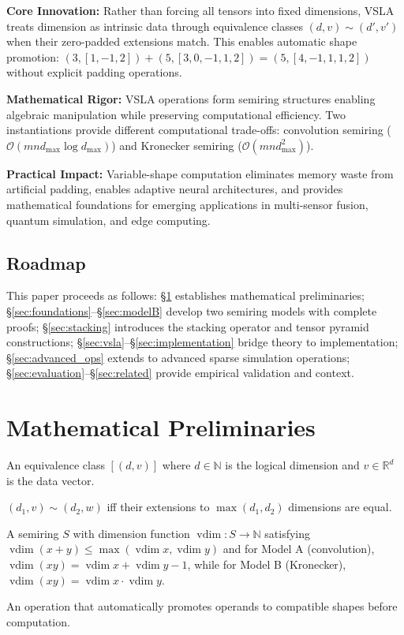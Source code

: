 \documentclass[11pt]{article}
\newcommand{\vdim}{\operatorname{vdim}}
\begin{document}
\textbf{Core Innovation:} Rather than forcing all tensors into fixed dimensions, VSLA treats dimension as intrinsic data through equivalence classes $(d,v) \sim (d',v')$ when their zero-padded extensions match. This enables automatic shape promotion: $(3,[1,-1,2]) + (5,[3,0,-1,1,2]) = (5,[4,-1,1,1,2])$ without explicit padding operations.

\textbf{Mathematical Rigor:} VSLA operations form semiring structures enabling algebraic manipulation while preserving computational efficiency. Two instantiations provide different computational trade-offs: convolution semiring ($\mathcal{O}(mn d_{\max} \log d_{\max})$) and Kronecker semiring ($\mathcal{O}(mn d_{\max}^2)$).

\textbf{Practical Impact:} Variable-shape computation eliminates memory waste from artificial padding, enables adaptive neural architectures, and provides mathematical foundations for emerging applications in multi-sensor fusion, quantum simulation, and edge computing.

\subsection{Roadmap}
This paper proceeds as follows: §\ref{sec:prelim} establishes mathematical preliminaries; §\ref{sec:foundations}–§\ref{sec:modelB} develop two semiring models with complete proofs; §\ref{sec:stacking} introduces the stacking operator and tensor pyramid constructions; §\ref{sec:vsla}–§\ref{sec:implementation} bridge theory to implementation; §\ref{sec:advanced_ops} extends to advanced sparse simulation operations; §\ref{sec:evaluation}–§\ref{sec:related} provide empirical validation and context.

\clearpage %

\section{Mathematical Preliminaries}
\label{sec:prelim}

\begin{tcolorbox}[colback=prelim,colframe=blue!50!black,title=Key Definitions]
\begin{description}[leftmargin=2em]
\item[Dimension-aware vector:] An equivalence class $[(d,v)]$ where $d \in \mathbb{N}$ is the logical dimension and $v \in \mathbb{R}^d$ is the data vector.
\item[Zero-padding equivalence:] $(d_1,v) \sim (d_2,w)$ iff their extensions to $\max(d_1,d_2)$ dimensions are equal.
\item[Shape-semiring:] A semiring $S$ with dimension function $\vdim: S \to \mathbb{N}$ satisfying $\vdim(x+y) \leq \max(\vdim x, \vdim y)$ and for Model A (convolution), $\vdim(xy) = \vdim x + \vdim y - 1$, while for Model B (Kronecker), $\vdim(xy) = \vdim x \cdot \vdim y$.
\item[Variable-shape operation:] An operation that automatically promotes operands to compatible shapes before computation.
\end{description}
\end{tcolorbox}
\end{document}
